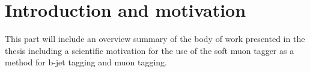 
\chapter{Introduction and motivation} \label{sec:introduction_and_motivation}
This part will include an overview summary of the body of work presented in the thesis including a scientific motivation for the use of the soft muon tagger as a method for b-jet tagging and muon tagging.
